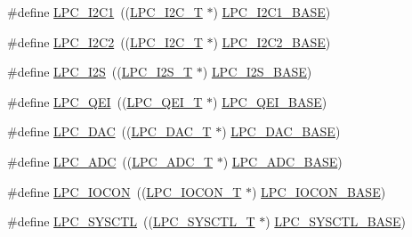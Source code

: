 \begin{DoxyCompactItemize}
\#define \hyperlink{group__PERIPH__175X__6X__BASE_gad6d6333e47875813be171cffef258837}{L\-P\-C\-\_\-\-I2\-C1}~((\hyperlink{structLPC__I2C__T}{L\-P\-C\-\_\-\-I2\-C\-\_\-\-T}              $\ast$) \hyperlink{group__PERIPH__407X__8X__BASE_gae59f73cf24ff126be3b9a8b921926676}{L\-P\-C\-\_\-\-I2\-C1\-\_\-\-B\-A\-S\-E})
\item 
\#define \hyperlink{group__PERIPH__175X__6X__BASE_ga6bcdaa0ab66f4e3d213a488b34055557}{L\-P\-C\-\_\-\-I2\-C2}~((\hyperlink{structLPC__I2C__T}{L\-P\-C\-\_\-\-I2\-C\-\_\-\-T}              $\ast$) \hyperlink{group__PERIPH__407X__8X__BASE_ga00796bd1f1fa200bbffcd9e7e8679eaa}{L\-P\-C\-\_\-\-I2\-C2\-\_\-\-B\-A\-S\-E})
\item 
\#define \hyperlink{group__PERIPH__175X__6X__BASE_ga1d2800cab1a50bdf99efe66d6028b663}{L\-P\-C\-\_\-\-I2\-S}~((\hyperlink{structLPC__I2S__T}{L\-P\-C\-\_\-\-I2\-S\-\_\-\-T}              $\ast$) \hyperlink{group__PERIPH__407X__8X__BASE_gacff8b54e3924910d381e6b8ba804050c}{L\-P\-C\-\_\-\-I2\-S\-\_\-\-B\-A\-S\-E})
\item 
\#define \hyperlink{group__PERIPH__175X__6X__BASE_ga71347b58898f54f8e9f00a6c652c7d49}{L\-P\-C\-\_\-\-Q\-E\-I}~((\hyperlink{structLPC__QEI__T}{L\-P\-C\-\_\-\-Q\-E\-I\-\_\-\-T}              $\ast$) \hyperlink{group__PERIPH__407X__8X__BASE_ga80fa25b18324c10c8e5c26893e6f0a67}{L\-P\-C\-\_\-\-Q\-E\-I\-\_\-\-B\-A\-S\-E})
\item 
\#define \hyperlink{group__PERIPH__175X__6X__BASE_ga5b94918e9ea326d84ab862a5d377903b}{L\-P\-C\-\_\-\-D\-A\-C}~((\hyperlink{structLPC__DAC__T}{L\-P\-C\-\_\-\-D\-A\-C\-\_\-\-T}              $\ast$) \hyperlink{group__PERIPH__407X__8X__BASE_ga3bbaedad584252212d4704bb419489f6}{L\-P\-C\-\_\-\-D\-A\-C\-\_\-\-B\-A\-S\-E})
\item 
\#define \hyperlink{group__PERIPH__175X__6X__BASE_gab6eaf639d3a1eec83583a9e11ab7336f}{L\-P\-C\-\_\-\-A\-D\-C}~((\hyperlink{structLPC__ADC__T}{L\-P\-C\-\_\-\-A\-D\-C\-\_\-\-T}              $\ast$) \hyperlink{group__PERIPH__407X__8X__BASE_ga2396e0d0c565e4c1c3b2fc593bd6c37f}{L\-P\-C\-\_\-\-A\-D\-C\-\_\-\-B\-A\-S\-E})
\item 
\#define \hyperlink{group__PERIPH__175X__6X__BASE_gaabc651799ba17b0dd4a0114c8d48a145}{L\-P\-C\-\_\-\-I\-O\-C\-O\-N}~((\hyperlink{structLPC__IOCON__T}{L\-P\-C\-\_\-\-I\-O\-C\-O\-N\-\_\-\-T}            $\ast$) \hyperlink{group__PERIPH__407X__8X__BASE_gae48aea115d5924805263d7a15402d4fa}{L\-P\-C\-\_\-\-I\-O\-C\-O\-N\-\_\-\-B\-A\-S\-E})
\item 
\#define \hyperlink{group__PERIPH__175X__6X__BASE_ga30cc92eba86b30295b3dcf3da503b736}{L\-P\-C\-\_\-\-S\-Y\-S\-C\-T\-L}~((\hyperlink{structLPC__SYSCTL__T}{L\-P\-C\-\_\-\-S\-Y\-S\-C\-T\-L\-\_\-\-T}           $\ast$) \hyperlink{group__PERIPH__407X__8X__BASE_gae4670b50fe27772fa31de1da10bec7b7}{L\-P\-C\-\_\-\-S\-Y\-S\-C\-T\-L\-\_\-\-B\-A\-S\-E})

\end{DoxyCompactItemize}
